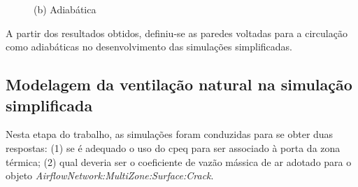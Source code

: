 \documentclass[brazil,hardcopy,openany]{ufscthesis} %
\begin{document}
\begin{figure}[h]
\begin{minipage}{.5\textwidth}
		\begin{center}
			\small{(b) Adiabática}\\
		\end{center}
	\end{minipage}
	\label{fig:szout}
\end{figure}



A partir dos resultados obtidos, definiu-se as paredes voltadas para a circulação como adiabáticas no desenvolvimento das simulações simplificadas.

\subsection*{Modelagem da ventilação natural na simulação simplificada}

Nesta etapa do trabalho, as simulações foram conduzidas para se obter duas respostas:
(1) se é adequado o uso do \acrfull{cpeq} para ser associado à porta da zona térmica; (2) qual deveria ser o coeficiente de vazão mássica de ar adotado para o objeto \textit{AirflowNetwork:MultiZone:Surface:Crack}.
\end{document}
